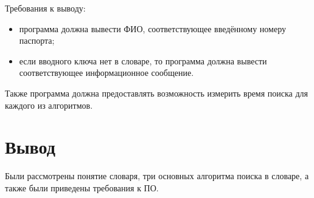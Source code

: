 Требования к выводу: 
\begin{itemize}
	\item программа должна вывести ФИО, соответствующее введённому номеру паспорта;
	\item если вводного ключа нет в словаре, то программа должна вывести соответствующее информационное сообщение. 
\end{itemize}

Также программа должна предоставлять возможность измерить время поиска для каждого из алгоритмов.

\section{Вывод}
Были рассмотрены понятие словаря, три основных алгоритма поиска в словаре, 
а также были приведены требования к ПО.